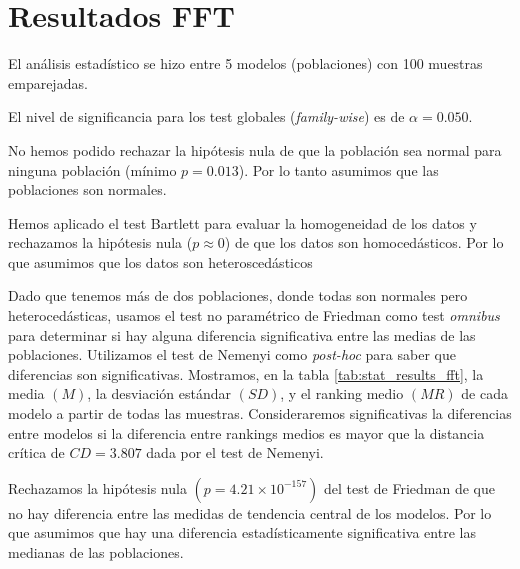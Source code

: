 \documentclass[a4paper,oneside,11pt,leqno]{article}
\begin{document}
	\section{Resultados FFT}
	\label{sec:results_fft}

	El análisis estadístico se hizo entre 5 modelos (poblaciones) con 100 muestras emparejadas.

	El nivel de significancia para los test globales (\textit{family-wise}) es de $\alpha=0.050$.

	No hemos podido rechazar la hipótesis nula de que la población sea normal para ninguna población (mínimo $p=0.013$). Por lo tanto asumimos que las poblaciones son normales.

	Hemos aplicado el test Bartlett para evaluar la homogeneidad de los datos y rechazamos la hipótesis nula ($p\approx 0$) de que los datos son homocedásticos. Por lo que asumimos que los datos son heteroscedásticos

	Dado que tenemos más de dos poblaciones, donde todas son normales pero heterocedásticas, usamos el test no paramétrico de Friedman como test \textit{omnibus} para determinar si hay alguna diferencia significativa entre las medias de las poblaciones. Utilizamos el test de Nemenyi como \textit{post-hoc} para saber que diferencias son significativas. Mostramos, en la tabla \ref{tab:stat_results_fft}, la media $(M)$, la desviación estándar $(SD)$, y el ranking medio $(MR)$ de cada modelo a partir de todas las muestras. Consideraremos significativas la diferencias entre modelos si la diferencia entre rankings medios es mayor que la distancia crítica de $CD=3.807$ dada por el test de Nemenyi.

	Rechazamos la hipótesis nula $(p=4.21\times 10^{-157})$ del test de Friedman de que no hay diferencia entre las medidas de tendencia central de los modelos. Por lo que asumimos que hay una diferencia estadísticamente significativa entre las medianas de las poblaciones.
\end{document}
